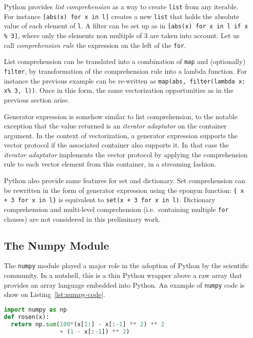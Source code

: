 \documentclass[preprint]{sigplanconf}
\begin{document}
Python provides \emph{list comprehension} as a way to create \texttt{list} from
any iterable. For instance \texttt{[abs(x) for x in l]} creates a new
\texttt{list} that holds the absolute value of each element of \texttt{l}. A
filter can be set up as in  \texttt{[abs(x) for x in l if x \% 3]}, where only
the elements non multiple of 3 are taken into account. Let us call
\emph{comprehension rule} the expression on the left of the
\texttt{for}.

List comprehension can be translated into a combination of \texttt{map} and
(optionally) \texttt{filter}, by transformation of the comprehension rule into
a lambda function. For instance the previous example can be re-written as
\texttt{map(abs, filter(lambda x: x\% 3, l))}. Once in this form, the same
    vectorization opportunities as in the previous section arise.

Generator expression is somehow similar to list comprehension, to the notable
exception that the value returned is an \emph{iterator adaptator} on the
container argument. In the context of vectorization, a generator expression
supports the vector protocol if the associated container also supports it. In
that case the  \emph{iterator adaptator} implements the vector protocol by
applying the comprehension rule to each vector element from this container, in a
streaming fashion.

Python also provide same features for set and dictionary.  Set comprehension
can be rewritten in the form of generator expression using the eponym function:
\texttt{\{ x + 3 for x in l\}} is equivalent to \texttt{set(x + 3 for x in l)}.
Dictionary comprehension and multi-level comprehension (i.e.\ containing
multiple \texttt{for} clauses) are not considered in this preliminary work.

\subsection{The Numpy Module}

The \texttt{numpy} module played a major role in the adoption of Python by the
scientific community. In a nutshell, this is a thin Python wrapper above a raw
array that provides an array language embedded into Python. An example of
\texttt{numpy} code is show on Listing~\ref{lst:numpy-code}.

\begin{lstlisting}[language=python, label={lst:numpy-code}, caption={Sample \texttt{numpy} code.}]
import numpy as np
def rosen(x):
  return np.sum(100*(x[1:] - x[:-1] ** 2) ** 2
                + (1 - x[:-1]) ** 2)
\end{lstlisting}
\end{document}
